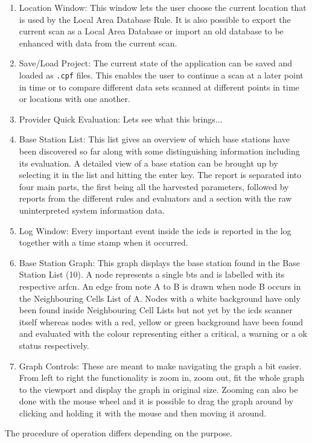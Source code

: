 \begin{enumerate}
\item Location Window: This window lets the user choose the current location that is used by the Local Area Database Rule.
It is also possible to export the current scan as a Local Area Database or import an old database to be enhanced with data from the current scan.

\item Save/Load Project: The current state of the application can be saved and loaded as \texttt{.cpf} files.
This enables the user to continue a scan at a later point in time or to compare different data sets scanned at different points in time or locations with one another.

\item Provider Quick Evaluation: Lets see what this brings...

\item Base Station List: This list gives an overview of which base stations have been discovered so far along with some distinguishing information including its evaluation.
A detailed view of a base station can be brought up by selecting it in the list and hitting the enter key.
The report is separated into four main parts, the first being all the harvested parameters, followed by reports from the different rules and evaluators and a section with the raw uninterpreted system information data.
 
\item Log Window: Every important event inside the \gls{icds} is reported in the log together with a time stamp when it occurred.

\item Base Station Graph: This graph displays the base station found in the Base Station List (10).
A node represents a single \gls{bts} and is labelled with its respective \gls{arfcn}.
An edge from note A to B is drawn when node B occurs in the Neighbouring Cells List of A.
Nodes with a white background have only been found inside Neighbouring Cell Lists but not yet by the \gls{icds} scanner itself whereas nodes with a red, yellow or green background have been found and evaluated with the colour representing either a critical, a warning or a ok status respectively.

\item Graph Controls: These are meant to make navigating the graph a bit easier.
From left to right the functionality is zoom in, zoom out, fit the whole graph to the viewport and display the graph in original size.
Zooming can also be done with the mouse wheel and it is possible to drag the graph around by clicking and holding it with the mouse and then moving it around. 

\end{enumerate}
The procedure of operation differs depending on the purpose.

